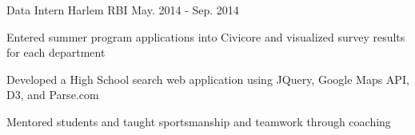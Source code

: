 \begin{cventries}
\iffalse
  \cventry
    {IT Assistant} %
    {CCNY Tech Center} %
	{Sep. 2014 - Oct. 2014} %
    {} %
    {
      \begin{cvitems} %
        \item {Assisted students with login and print issues}
        \item {Managed reservations for the study rooms}
        \item {Performed maintenance and troubleshooting on lab computers}
      \end{cvitems}
    }
\fi

\iftrue
  \cventry
    {Data Intern} %
    {Harlem RBI} %
	{May. 2014 - Sep. 2014} %
    {} %
    {
      \begin{cvitems} %
        \item {Entered summer program applications into Civicore and visualized survey results for each department}
        \item {Developed a High School search web application using JQuery, Google Maps API, D3, and Parse.com}
        \item {Mentored students and taught sportsmanship and teamwork through coaching}
      \end{cvitems}
    }
\fi


\end{cventries}
